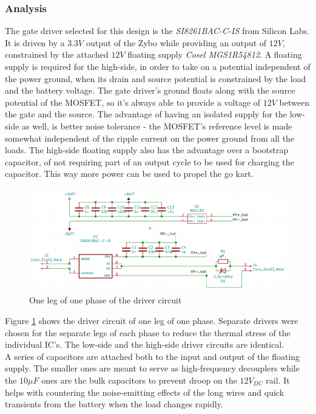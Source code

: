 \subsubsection{Analysis}
The gate driver selected for this design is the \textit{SI8261BAC-C-IS}\cite{Si8261} from Silicon Labs. It is driven by a $3.3V$ output of the Zybo while providing an output of $12V$, constrained by the attached $12V$ floating supply \textit{Cosel MGS1R54812}\cite{MGS1R5}. A floating supply is required for the high-side, in order to take on a potential independent of the power ground, when its drain and source potential is constrained by the load and the battery voltage. The gate driver's ground floats along with the source potential of the MOSFET, so it's always able to provide a voltage of $12V$ between the gate and the source. The advantage of having an isolated supply for the low-side as well, is better noise tolerance - the MOSFET's reference level is made somewhat independent of the ripple current on the power ground from all the loads. The high-side floating supply also has the advantage over a bootstrap capacitor, of not requiring part of an output cycle to be used for charging the capacitor. This way more power can be used to propel the go kart.

\begin{figure}[H]
	\centering
	\includegraphics[width=1\linewidth]{pictures/hardware/Driver_Board/driver_circuit.png}
	\caption{One leg of one phase of the driver circuit}
	\label{fig:driver_circuit}
\end{figure}

Figure \ref{fig:driver_circuit} shows the driver circuit of one leg of one phase. Separate drivers were chosen for the separate legs of each phase to reduce the thermal stress of the individual IC's. The low-side and the high-side driver circuits are identical. \\

A series of capacitors are attached both to the input and output of the floating supply. The smaller ones are meant to serve as high-frequency decouplers while the $10$$\mu$$F$  ones are the bulk capacitors to prevent droop on the $12V_{DC}$ rail. It helps with countering the noise-emitting effects of the long wires and quick transients from the battery when the load changes rapidly. \\

